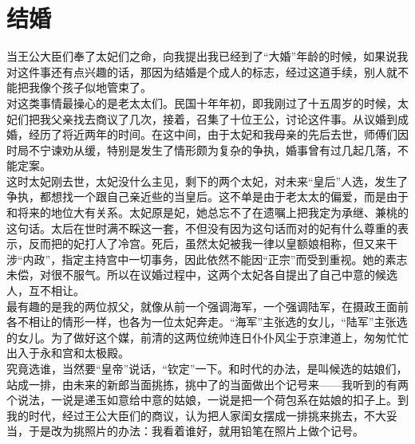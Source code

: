 \fancyhead[RO]{} %
\fancyhead[LE]{} %
\chapter*{结婚}
\thispagestyle{empty}
当王公大臣们奉了太妃们之命，向我提出我已经到了“大婚”年龄的时候，如果说我对这件事还有点兴趣的话，那因为结婚是个成人的标志，经过这道手续，别人就不能把我像个孩子似地管束了。\\

对这类事情最操心的是老太太们。民国十年年初，即我刚过了十五周岁的时候，太妃们把我父亲找去商议了几次，接着，召集了十位王公，讨论这件事。从议婚到成婚，经历了将近两年的时间。在这中间，由于太妃和我母亲的先后去世，师傅们因时局不宁谏劝从缓，特别是发生了情形颇为复杂的争执，婚事曾有过几起几落，不能定案。\\

这时太妃刚去世，太妃没什么主见，剩下的两个太妃，对未来“皇后”人选，发生了争执，都想找一个跟自己亲近些的当皇后。这不单是由于老太太的偏爱，而是由于和将来的地位大有关系。太妃原是妃，她总忘不了在遗嘱上把我定为承继、兼桃的这句话。太后在世时满不睬这一套，不但没有因为这句话而对的妃有什么尊重的表示，反而把的妃打人了冷宫。死后，虽然太妃被我一律以皇额娘相称，但又来干涉“内政”，指定主持宫中一切事务，因此依然不能因“正宗”而受到重视。她的素志未偿，对很不服气。所以在议婚过程中，这两个太妃各自提出了自己中意的候选人，互不相让。\\

最有趣的是我的两位叔父，就像从前一个强调海军，一个强调陆军，在摄政王面前各不相让的情形一样，也各为一位太妃奔走。“海军”主张选的女儿，“陆军”主张选的女儿。为了做好这个媒，前清的这两位统帅连日仆仆风尘于京津道上，匆匆忙忙出入于永和宫和太极殿。\\

究竟选谁，当然要“皇帝”说话，“钦定”一下。和时代的办法，是叫候选的姑娘们，站成一排，由未来的新郎当面挑拣，挑中了的当面做出个记号来——我听到的有两个说法，一说是递玉如意给中意的姑娘，一说是把一个荷包系在姑娘的扣子上。到我的时代，经过王公大臣们的商议，认为把人家闺女摆成一排挑来挑去，不大妥当，于是改为挑照片的办法：我看着谁好，就用铅笔在照片上做个记号。\\

